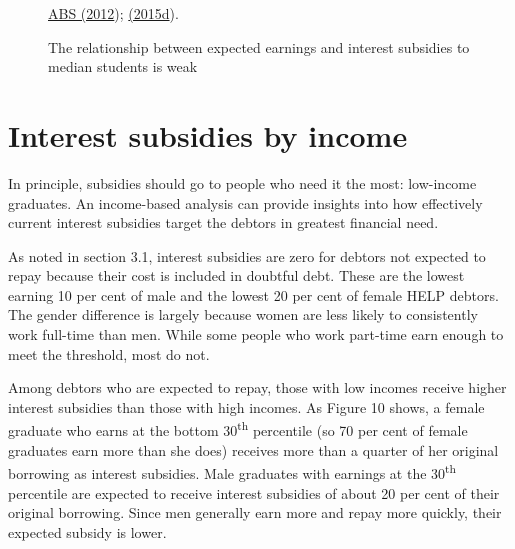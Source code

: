 \documentclass[embargoed]{grattan}
\begin{document}
\begin{figure}
\caption{The relationship between expected earnings and interest subsidies to median students is weak}\label{fig:fig9-relationship-expected-earnings-interest-subsides-to-median-students-weak}

%
{\protect\hyperlink{_ENREF_1}{ABS (2012}); \protect\hyperlink{_ENREF_5}{(2015d}).}
\end{figure}

\section{Interest subsidies by income}\label{interest-subsidies-by-income}

In principle, subsidies should go to people who need it the most: low-income graduates. An income-based analysis can provide insights into how effectively current interest subsidies target the debtors in greatest financial need.

As noted in section 3.1, interest subsidies are zero for debtors not expected to repay because their cost is included in doubtful debt. These are the lowest earning 10 per cent of male and the lowest 20 per cent of female HELP debtors. The gender difference is largely because women are less likely to consistently work full-time than men. While some people who work part-time earn enough to meet the threshold, most do not.

Among debtors who are expected to repay, those with low incomes receive higher interest subsidies than those with high incomes. As Figure 10 shows, a female graduate who earns at the bottom 30\textsuperscript{th} percentile (so 70 per cent of female graduates earn more than she does) receives more than a quarter of her original borrowing as interest subsidies. Male graduates with earnings at the 30\textsuperscript{th} percentile are expected to receive interest subsidies of about 20 per cent of their original borrowing. Since men generally earn more and repay more quickly, their expected subsidy is lower.
\end{document}
